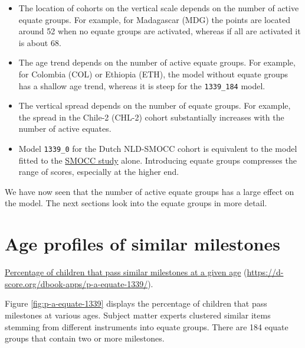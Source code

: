 \documentclass[
]{book}
\begin{document}
\begin{itemize}
\item
  The location of cohorts on the vertical scale depends on the number of active equate groups. For example, for Madagascar (MDG) the points are located around 52 when no equate groups are activated, whereas if all are activated it is about 68.
\item
  The age trend depends on the number of active equate groups. For example, for Colombia (COL) or Ethiopia (ETH), the model without equate groups has a shallow age trend, whereas it is steep for the \texttt{1339\_184} model.
\item
  The vertical spread depends on the number of equate groups. For example, the spread in the Chile-2 (CHL-2) cohort substantially increases with the number of active equates.
\item
  Model \texttt{1339\_0} for the Dutch NLD-SMOCC cohort is equivalent to the model fitted to the \href{https://d-score.org/dbook1/sec-smoccstudy.html}{SMOCC study} alone. Introducing equate groups compresses the range of scores, especially at the higher end.
\end{itemize}

We have now seen that the number of active equate groups has a large effect on the model. The next sections look into the equate groups in more detail.

\hypertarget{sec:ageprofiles}{%
\section{Age profiles of similar milestones}\label{sec:ageprofiles}}

\label{fig:p-a-equate-1339}\href{https://d-score.org/dbook-apps/p-a-equate-1339/\#display=Percent_pass_by_age_for_all_equate_groups\&nrow=1\&ncol=1\&arr=row\&pg=65\&labels=equate\&sort=equate_index;asc\&filter=\&sidebar=\&fv=}{Percentage of children that pass similar milestones at a given age} (\url{https://d-score.org/dbook-apps/p-a-equate-1339/}).



Figure \ref{fig:p-a-equate-1339} displays the percentage of children that pass milestones at various ages. Subject matter experts clustered similar items stemming from different instruments into equate groups. There are 184 equate groups that contain two or more milestones.
\end{document}
